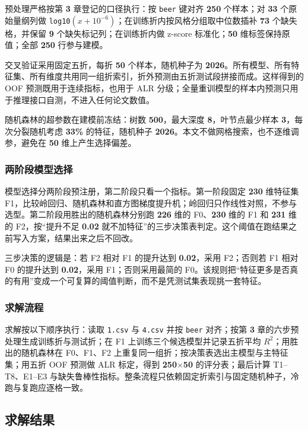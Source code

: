 预处理严格按第 \textbf{3} 章登记的口径执行：按 \texttt{beer} 键对齐 \textbf{250} 个样本；对 \textbf{33} 个原始量纲列做 \texttt{log10}$(x+10^{-6})$；在训练折内按风格分组取中位数插补 \textbf{73} 个缺失格，并保留 \textbf{9} 个缺失标记列；在训练折内做 z-score 标准化；\textbf{50} 维标签保持原值；全部 \textbf{250} 行参与建模。

交叉验证采用固定五折，每折 \textbf{50} 个样本，随机种子为 \textbf{2026}。所有模型、所有特征集、所有维度共用同一组折索引，折外预测由五折测试段拼接而成。这样得到的 OOF 预测既用于连续指标，也用于 ALR 分级；全量重训模型的样本内预测只用于推理接口自测，不进入任何论文数值。

随机森林的超参数在建模前冻结：树数 \textbf{500}，最大深度 \textbf{8}，叶节点最少样本 \textbf{3}，每次分裂随机考虑 \textbf{33\%} 的特征，随机种子 \textbf{2026}。本文不做网格搜索，也不逐维调参，避免在 \textbf{50} 维上产生选择偏差。

\subsubsection{两阶段模型选择}

模型选择分两阶段预注册，第二阶段只看一个指标。第一阶段固定 \textbf{230} 维特征集 F1，比较岭回归、随机森林和直方图梯度提升机；岭回归只作线性对照，不参与选型。第二阶段用胜出的随机森林分别跑 \textbf{226} 维的 F0、\textbf{230} 维的 F1 和 \textbf{231} 维的 F2，按“提升不足 \textbf{0.02} 就不加特征”的三步决策表判定。这个阈值在跑结果之前写入方案，结果出来之后不回改。

三步决策的逻辑是：若 F2 相对 F1 的提升达到 \textbf{0.02}，采用 F2；否则若 F1 相对 F0 的提升达到 \textbf{0.02}，采用 F1；否则采用最简的 F0。该规则把“特征更多是否真的有用”变成一个可复算的阈值判断，而不是凭测试集表现挑一套特征。

\subsubsection{求解流程}

求解按以下顺序执行：读取 \texttt{1.csv} 与 \texttt{4.csv} 并按 \texttt{beer} 对齐；按第 \textbf{3} 章的六步预处理生成训练折与测试折；在 F1 上训练三个候选模型并记录五折平均 $R^2$；用胜出的随机森林在 F0、F1、F2 上重复同一组折；按决策表选出主模型与主特征集；用五折 OOF 预测做 ALR 标定，得到 \textbf{250}$\times$\textbf{50} 的评分表；最后计算 T1--T8、E1--E3 与缺失鲁棒性指标。整条流程只依赖固定折索引与固定随机种子，冷跑与复跑应逐格一致。

\subsection{求解结果}

